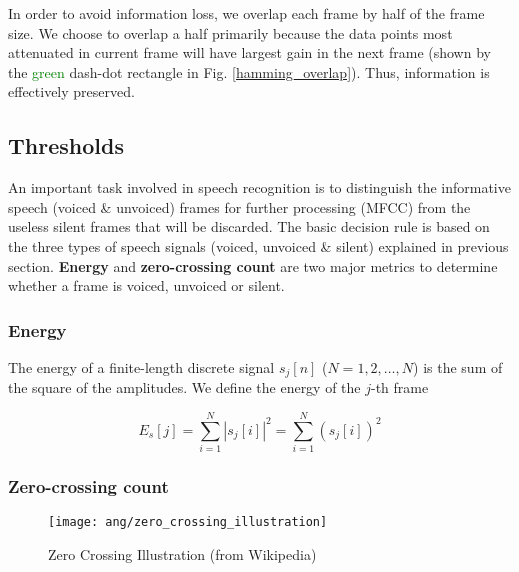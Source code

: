In order to avoid information loss, we overlap each frame by half of the frame size. We choose to overlap a half primarily because the data points most attenuated in current frame will have largest gain in the next frame (shown by the \textcolor{green}{green} dash-dot rectangle in Fig. \ref{hamming_overlap}). Thus, information is effectively preserved.


\subsection{Thresholds}

An important task involved in speech recognition is to distinguish the informative speech (voiced \& unvoiced) frames for further processing (MFCC) from the useless silent frames that will be discarded. The basic decision rule is based on the three types of speech signals (voiced, unvoiced \& silent) explained in previous section. \textbf{Energy} and \textbf{zero-crossing count} are two major metrics to determine whether a frame is voiced, unvoiced or silent.


\subsubsection{Energy}

The energy of a finite-length discrete signal $s_j[n]$ ($N = 1, 2, \dots, N$) is the sum of the square of the amplitudes. We define the energy of the $j$-th frame

\begin{equation}
\label{eq:frame-energy}
E_s[j] = \sum_{i=1}^{N} |s_j[i]|^2 = \sum_{i=1}^{N} (s_j[i])^2
\end{equation}


\subsubsection{Zero-crossing count}

\begin{figure}[H]
\centering
\texttt{[image: ang/zero\_crossing\_illustration]}
\caption{Zero Crossing Illustration (from Wikipedia)}
\label{zero_crossing_illustration}
\end{figure}

